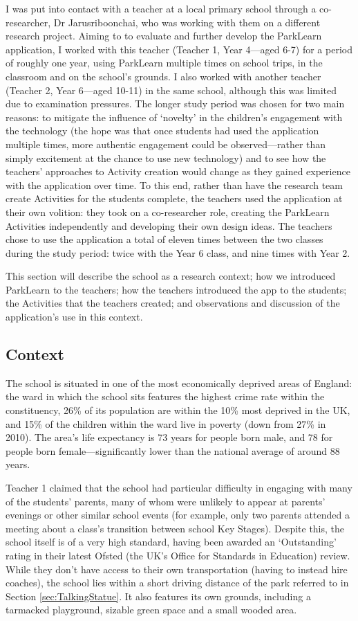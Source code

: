 I was put into contact with a teacher at a local primary school through a co-researcher, Dr Jarusriboonchai, who was working with them on a different research project. Aiming to to evaluate and further develop the ParkLearn application, I worked with this teacher (Teacher 1, Year 4---aged 6-7) for a period of roughly one year, using ParkLearn multiple times on school trips, in the classroom and on the school's grounds. I also worked with another teacher (Teacher 2, Year 6---aged 10-11) in the same school, although this was limited due to examination pressures. The longer study period was chosen for two main reasons: to mitigate the influence of `novelty' in the children’s engagement with the technology (the hope was that once students had used the application multiple times, more authentic engagement could be observed---rather than simply excitement at the chance to use new technology) \citep{Sharples2013} and to see how the teachers' approaches to Activity creation would change as they gained experience with the application over time. To this end, rather than have the research team create Activities for the students complete, the teachers used the application at their own volition: they took on a co-researcher role, creating the ParkLearn Activities independently and developing their own design ideas. The teachers chose to use the application a total of eleven times between the two classes during the study period: twice with the Year 6 class, and nine times with Year 2.

This section will describe the school as a research context; how we introduced ParkLearn to the teachers; how the teachers introduced the app to the students; the Activities that the teachers created; and observations and discussion of the application's use in this context.

\subsection{Context}
The school is situated in one of the most economically deprived areas of England: the ward in which the school sits features the highest crime rate within the constituency, 26\% of its population are within the 10\% most deprived in the UK, and 15\% of the children within the ward live in poverty (down from 27\% in 2010). The area's life expectancy is 73 years for people born male, and 78 for people born female---significantly lower than the national average of around 88 years.

Teacher 1 claimed that the school had particular difficulty in engaging with many of the students' parents, many of whom were unlikely to appear at parents' evenings or other similar school events (for example, only two parents attended a meeting about a class's transition between school Key Stages). Despite this, the school itself is of a very high standard, having been awarded an `Outstanding' rating in their latest Ofsted (the UK’s Office for Standards in Education) review. While they don't have access to their own transportation (having to instead hire coaches), the school lies within a short driving distance of the park referred to in Section \ref{sec:TalkingStatue}. It also features its own grounds, including a tarmacked playground, sizable green space and a small wooded area.

